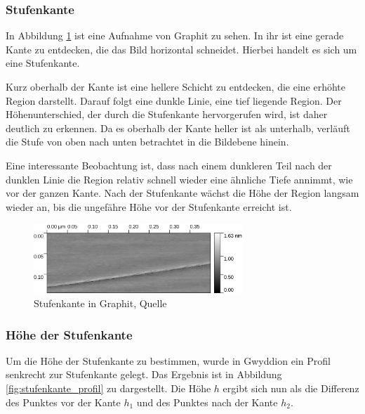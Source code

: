 \documentclass[12pt,a4paper]{scrartcl}
\numberwithin{equation}{section} %
\begin{document}
\hypertarget{messungen HOPG}{%
\subsubsection{Stufenkante}\label{messungen HOPG}}
In Abbildung \ref{abb:Stufenkante HOPG} ist eine Aufnahme von Graphit zu sehen. In ihr ist eine gerade Kante zu entdecken, die das Bild horizontal schneidet. Hierbei handelt es sich um eine Stufenkante.

Kurz oberhalb der Kante ist eine hellere Schicht zu entdecken, die eine erhöhte Region darstellt. Darauf folgt eine dunkle Linie, eine tief liegende Region. Der Höhenunterschied, der durch die Stufenkante hervorgerufen wird, ist daher deutlich zu erkennen. Da es oberhalb der Kante heller ist als unterhalb, verläuft die Stufe von oben nach unten betrachtet in die Bildebene hinein.

Eine interessante Beobachtung ist, dass nach einem dunkleren Teil nach der dunklen Linie die Region relativ schnell wieder eine ähnliche Tiefe annimmt, wie vor der ganzen Kante. Nach der Stufenkante wächst die Höhe der Region langsam wieder an, bis die ungefähre Höhe vor der Stufenkante erreicht ist.

\begin{figure}[h!]
	\centering
	\includegraphics[width=0.7\textwidth]{../media/B2.5/HOPG Stufenkante.jpg}
	\caption{Stufenkante in Graphit, Quelle \cite{Grover}}
	\label{abb:Stufenkante HOPG}
\end{figure}

\hypertarget{Stufenkante Höhe}{
\subsubsection{Höhe der Stufenkante}\label{Stufenkante Höhe}}
Um die Höhe der Stufenkante zu bestimmen, wurde in Gwyddion \cite{Gwyddion} ein Profil senkrecht zur Stufenkante gelegt. Das Ergebnis ist in Abbildung \ref{fig:stufenkante_profil} zu dargestellt. Die Höhe $h$ ergibt sich nun als die Differenz des Punktes vor der Kante $h_1$ und des Punktes nach der Kante $h_2$.
\end{document}
